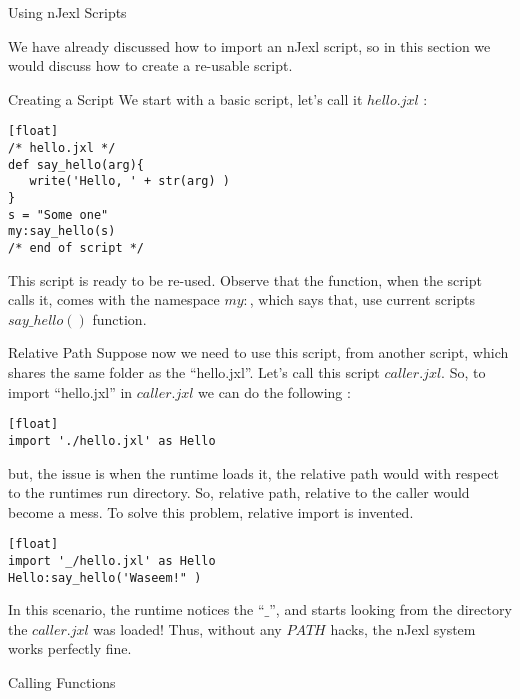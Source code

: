 \begin{section}{Using nJexl Scripts}

We have already discussed how to import an nJexl script, 
so in this section we would discuss how to create a re-usable script.

\begin{subsection}{Creating a Script}
We start with a basic script, let's call it $hello.jxl$ :

\begin{lstlisting}[style=JexlStyle][float]
/* hello.jxl */
def say_hello(arg){
   write('Hello, ' + str(arg) )
}
s = "Some one"
my:say_hello(s)
/* end of script */
\end{lstlisting}
This script is ready to be re-used.
Observe that the function, when the script calls it, 
comes with the namespace $my:$, which says that, 
use current scripts $say\_hello()$ function.

\end{subsection}


\begin{subsection}{Relative Path}
Suppose now we need to use this script, from another script, 
which shares the same folder as the ``hello.jxl''. 
Let's call this script $caller.jxl$. So, to import 
``hello.jxl'' in $caller.jxl$ we can do the following :

\begin{lstlisting}[style=JexlStyle][float]
import './hello.jxl' as Hello
\end{lstlisting}
   
but, the issue is when the runtime loads it, 
the relative path would with respect to the runtimes 
run directory. So, relative path, relative to the caller
would become a mess. To solve this problem, relative import is invented.

\begin{lstlisting}[style=JexlStyle][float]
import '_/hello.jxl' as Hello
Hello:say_hello('Waseem!" ) 
\end{lstlisting}

In this scenario, the runtime notices the ``$\_$'', and 
starts looking from the directory the $caller.jxl$ was loaded!    
Thus, without any $PATH$ hacks, the nJexl system works perfectly fine.

\end{subsection}

\begin{subsection}{Calling Functions}


\end{subsection}
\end{section}
